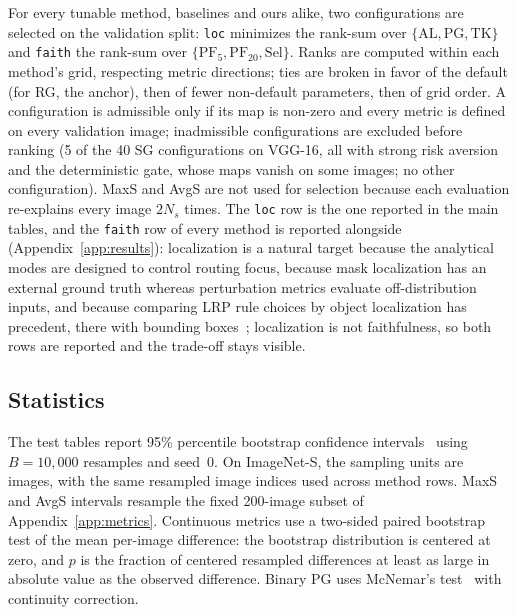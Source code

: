 \documentclass[twoside]{article}
\newcommand{\1}{\mathbf{1}}
\begin{document}
For every tunable method, baselines and ours alike, two configurations are selected on the
validation split: \texttt{loc} minimizes the rank-sum over $\{\text{AL}, \text{PG}, \text{TK}\}$
and \texttt{faith} the rank-sum over $\{\text{PF}_5, \text{PF}_{20}, \text{Sel}\}$. Ranks are
computed within each method's grid, respecting metric directions; ties are broken in favor of the
default (for \ac{RG}, the anchor), then of fewer non-default parameters, then of grid order. A
configuration is admissible only if its map is non-zero and every metric is defined on every
validation image; inadmissible configurations are excluded before ranking (5 of the 40 \ac{SG}
configurations on VGG-16, all with strong risk aversion and the deterministic gate, whose maps
vanish on some images; no other configuration). MaxS and AvgS are not used for selection because
each evaluation re-explains every image $2N_s$ times. The \texttt{loc} row is the one reported in
the main tables, and the \texttt{faith} row of every method is reported alongside
(Appendix~\ref{app:results}): localization is a natural target because the analytical modes are
designed to control routing focus, because mask localization has an external ground truth whereas
perturbation metrics evaluate off-distribution inputs, and because comparing \ac{LRP} rule choices
by object localization has precedent, there with bounding boxes~\citep{Kohlbrenner2020};
localization is not faithfulness, so both rows are reported and the trade-off stays visible.

\subsection{Statistics}\label{app:stats}

The test tables report 95\% percentile bootstrap confidence intervals~\citep{Efron1993bootstrap}
using $B=10{,}000$ resamples and seed~$0$. On ImageNet-S, the sampling units are images, with the
same resampled image indices used across method rows. MaxS and AvgS intervals resample the fixed
200-image subset of Appendix~\ref{app:metrics}. Continuous metrics use a two-sided paired bootstrap
test of the mean per-image difference: the bootstrap distribution is centered at zero, and $p$ is
the fraction of centered resampled differences at least as large in absolute value as the observed
difference. Binary PG uses McNemar's test~\citep{McNemar1947} with continuity correction.
\end{document}
